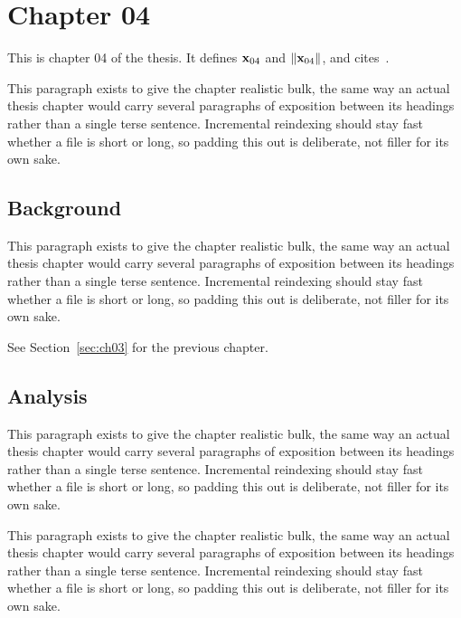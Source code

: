 \section{Chapter 04}
\label{sec:ch04}

This is chapter 04 of the thesis. It defines $\mathbf{x}_{04}$ and $\lVert \mathbf{x}_{04} \rVert$, and cites~\cite{ref1}.

This paragraph exists to give the chapter realistic bulk, the same way an actual thesis chapter would carry several paragraphs of exposition between its headings rather than a single terse sentence. Incremental reindexing should stay fast whether a file is short or long, so padding this out is deliberate, not filler for its own sake.

\subsection{Background}
\label{sec:ch04:background}

This paragraph exists to give the chapter realistic bulk, the same way an actual thesis chapter would carry several paragraphs of exposition between its headings rather than a single terse sentence. Incremental reindexing should stay fast whether a file is short or long, so padding this out is deliberate, not filler for its own sake.

See Section~\ref{sec:ch03} for the previous chapter.

\subsection{Analysis}
\label{sec:ch04:analysis}

This paragraph exists to give the chapter realistic bulk, the same way an actual thesis chapter would carry several paragraphs of exposition between its headings rather than a single terse sentence. Incremental reindexing should stay fast whether a file is short or long, so padding this out is deliberate, not filler for its own sake.

This paragraph exists to give the chapter realistic bulk, the same way an actual thesis chapter would carry several paragraphs of exposition between its headings rather than a single terse sentence. Incremental reindexing should stay fast whether a file is short or long, so padding this out is deliberate, not filler for its own sake.
